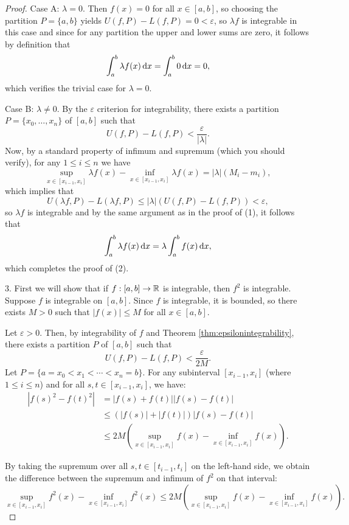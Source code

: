 \documentclass[../analysis1.tex]{subfiles}
\begin{document}
\begin{proof}
    Case A: $\lambda = 0$. Then $f(x)=0$ for all $x\in [a,b]$, so choosing the partition $P=\{a,b\}$ yields $U(f,P)-L(f,P)=0<\varepsilon$, so $\lambda f$ is integrable in this case and since for any partition the upper and lower sums are zero, it follows by definition that \[\int_a^b \lambda f(x)\d{x}=\int_a^b 0 \d{x}=0,\]
    which verifies the trivial case for $\lambda = 0$.

    Case B: $\lambda \ne 0$. By the $\varepsilon$ criterion for integrability, there exists a partition $P=\{x_0,\dots,x_n\}$ of $[a,b]$ such that
    \[U(f,P)-L(f,P)<\frac{\varepsilon}{|\lambda|}.\]
    Now, by a standard property of infimum and supremum (which you should verify), for any $1\le i\le n$ we have
    \[\sup_{x\in[x_{i-1},x_i]}\lambda f(x)-\inf_{x\in[x_{i - 1},x_i]}\lambda f(x)=|\lambda|\left(M_i-m_i\right),\]
    which implies that
    \[U(\lambda f,P)-L(\lambda f,P)\le |\lambda|\left(U(f,P)-L(f,P)\right)<\varepsilon,\]
    so $\lambda f$ is integrable and by the same argument as in the proof of (1), it follows that
    \[\int_a^b \lambda f(x)\d{x}=\lambda \int_a^b f(x)\d{x},\]
    which completes the proof of (2).\hfill \qedsymbol

    3. First we will show that if $f:[a,b]\to\mathbb{R}$ is integrable, then $f^2$ is integrable. Suppose $f$ is integrable on $[a,b]$. Since $f$ is integrable, it is bounded, so there exists $M > 0$ such that $|f(x)| \le M$ for all $x \in [a,b]$.

Let $\varepsilon > 0$. Then, by integrability of $f$ and Theorem \ref{thm:epsilonintegrability}, there exists a partition $P$ of $[a,b]$ such that
\[ U(f,P) - L(f,P) < \frac{\varepsilon}{2M}. \]
Let $P = \{a = x_0 < x_1 < \cdots < x_n = b\}$. For any subinterval $[x_{i-1}, x_i]$ (where $1 \le i \le n$) and for all $s, t \in [x_{i-1}, x_i]$, we have:
\begin{align*}
    |f(s)^2 - f(t)^2| &= |f(s) + f(t)| |f(s) - f(t)| \\
    &\le (|f(s)| + |f(t)|) |f(s) - f(t)| \\
    &\le 2M \left( \sup_{x \in [x_{i-1}, x_i]} f(x) - \inf_{x \in [x_{i-1}, x_i]} f(x) \right).
\end{align*}

By taking the supremum over all $s, t \in [t_{i-1}, t_i]$ on the left-hand side, we obtain the difference between the supremum and infimum of $f^2$ on that interval:
\[ \sup_{x \in [x_{i-1}, x_i]} f^2(x) - \inf_{x \in [x_{i-1}, x_i]} f^2(x) \le 2M \left( \sup_{x \in [x_{i-1}, x_i]} f(x) - \inf_{x \in [x_{i-1}, x_i]} f(x) \right). \]


\end{proof}
\end{document}
